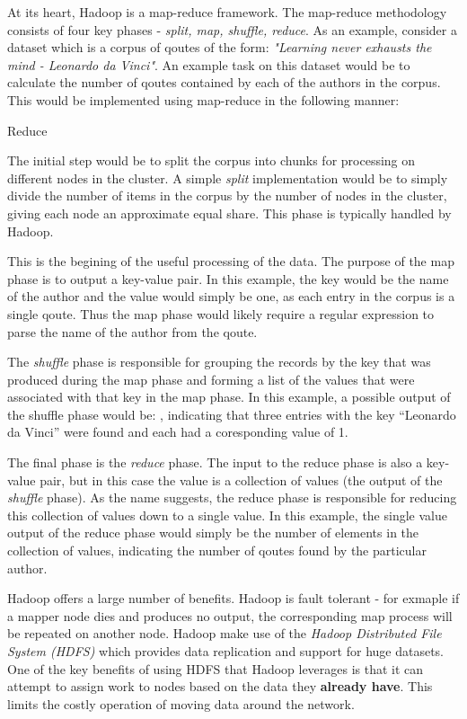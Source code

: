 At its heart, Hadoop is a map-reduce framework. The map-reduce methodology consists of four key phases - \textit{split, map, shuffle, reduce}. As an example, consider a dataset which is a corpus of qoutes of the form:
\textit{"Learning never exhausts the mind - Leonardo da Vinci"}. An example task on this dataset would be to calculate the number of qoutes contained by each of the authors in the corpus. This would be implemented using map-reduce in the following manner:

\begin{labeling}{Reduce }
	\item [Split] The initial step would be to split the corpus into chunks for processing on different nodes in the cluster. A simple \textit{split} implementation would be to simply divide the number of items in the corpus by the number of nodes in the cluster, giving each node an approximate equal share. This phase is typically handled by Hadoop.
  \item [Map] This is the begining of the useful processing of the data. The purpose of the map phase is to output a key-value pair. In this example, the key would be the name of the author and the value would simply be one, as each entry in the corpus is a single qoute. Thus the map phase would likely require a regular expression to parse the name of the author from the qoute.
  \item [Shuffle] The \textit{shuffle} phase is responsible for grouping the records by the key that was produced during the map phase and forming a list of the values that were associated with that key in the map phase. In this example, a possible output of the shuffle phase would be: , indicating that three entries with the key ``Leonardo da Vinci'' were found and each had a coresponding value of 1. 
  \item [Reduce] The final phase is the \textit{reduce} phase. The input to the reduce phase is also a key-value pair, but in this case the value is a collection of values (the output of the \textit{shuffle} phase). As the name suggests, the reduce phase is responsible for reducing this collection of values down to a single value. In this example, the single value output of the reduce phase would simply be the number of elements in the collection of values, indicating the number of qoutes found by the particular author.
\end{labeling}

Hadoop offers a large number of benefits. Hadoop is fault tolerant - for exmaple if a mapper node dies and produces no output, the corresponding map process will be repeated on another node. Hadoop make use of the \textit{Hadoop Distributed File System (HDFS)} \cite{HDFS} which provides data replication and support for huge datasets. One of the key benefits of using HDFS that Hadoop leverages is that it can attempt to assign work to nodes based on the data they \textbf{already have}. This limits the costly operation of moving data around the network. 



